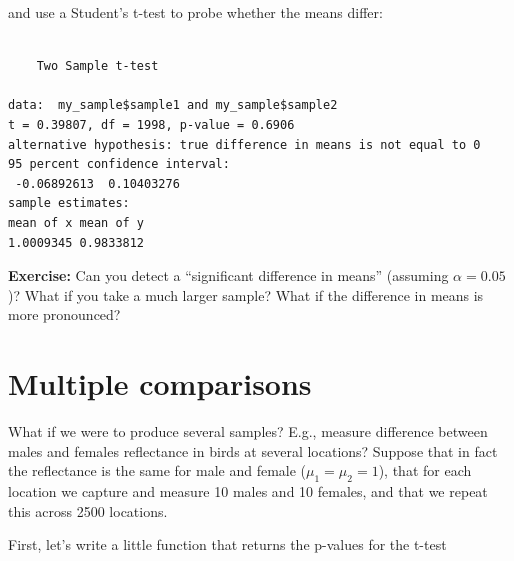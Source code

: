 \documentclass[
  letterpaper,
  DIV=11,
  numbers=noendperiod]{scrreprt}
\newenvironment{Shaded}{\begin{snugshade}}{\end{snugshade}}
\newcommand{\AttributeTok}[1]{\textcolor[rgb]{0.40,0.45,0.13}{#1}}
\newcommand{\CommentTok}[1]{\textcolor[rgb]{0.37,0.37,0.37}{#1}}
\newcommand{\ConstantTok}[1]{\textcolor[rgb]{0.56,0.35,0.01}{#1}}
\newcommand{\ControlFlowTok}[1]{\textcolor[rgb]{0.00,0.23,0.31}{#1}}
\newcommand{\FunctionTok}[1]{\textcolor[rgb]{0.28,0.35,0.67}{#1}}
\newcommand{\NormalTok}[1]{\textcolor[rgb]{0.00,0.23,0.31}{#1}}
\newcommand{\OtherTok}[1]{\textcolor[rgb]{0.00,0.23,0.31}{#1}}
\newcommand{\SpecialCharTok}[1]{\textcolor[rgb]{0.37,0.37,0.37}{#1}}
\begin{document}
and use a Student's t-test to probe whether the means differ:

\begin{Shaded}
\end{Shaded}

\begin{verbatim}

    Two Sample t-test

data:  my_sample$sample1 and my_sample$sample2
t = 0.39807, df = 1998, p-value = 0.6906
alternative hypothesis: true difference in means is not equal to 0
95 percent confidence interval:
 -0.06892613  0.10403276
sample estimates:
mean of x mean of y 
1.0009345 0.9833812 
\end{verbatim}

\textbf{Exercise:} Can you detect a ``significant difference in means''
(assuming \(\alpha = 0.05\))? What if you take a much larger sample?
What if the difference in means is more pronounced?

\hypertarget{multiple-comparisons}{%
\section{Multiple comparisons}\label{multiple-comparisons}}

What if we were to produce several samples? E.g., measure difference
between males and females reflectance in birds at several locations?
Suppose that in fact the reflectance is the same for male and female
(\(\mu_1 = \mu_2 = 1\)), that for each location we capture and measure
10 males and 10 females, and that we repeat this across 2500 locations.

First, let's write a little function that returns the p-values for the
t-test

\begin{Shaded}
\end{Shaded}
\end{document}
